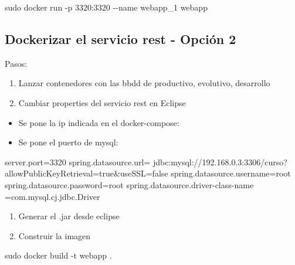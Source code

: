 \documentclass[
]{article}
\newenvironment{Shaded}{\begin{snugshade}}{\end{snugshade}}
\newcommand{\AttributeTok}[1]{\textcolor[rgb]{0.49,0.56,0.16}{#1}}
\newcommand{\FunctionTok}[1]{\textcolor[rgb]{0.02,0.16,0.49}{#1}}
\newcommand{\NormalTok}[1]{#1}
\providecommand{\tightlist}{%
  \setlength{\itemsep}{0pt}\setlength{\parskip}{0pt}}
\let\oldtexttt\texttt
\renewcommand{\texttt}[1]{
    \tcbox{\oldtexttt{#1}} 
}
\begin{document}
\begin{Shaded}
\begin{Highlighting}[]
\FunctionTok{sudo}\NormalTok{ docker run }\AttributeTok{{-}p}\NormalTok{ 3320:3320 }\AttributeTok{{-}{-}name}\NormalTok{ webapp\_1 webapp}
\end{Highlighting}
\end{Shaded}

\hypertarget{dockerizar-el-servicio-rest---opciuxf3n-2}{%
\subsection{Dockerizar el servicio rest - Opción
2}\label{dockerizar-el-servicio-rest---opciuxf3n-2}}

Pasos:

\begin{enumerate}
\def\labelenumi{\arabic{enumi}.}
\tightlist
\item
  Lanzar contenedores con las bbdd de productivo, evolutivo, desarrollo
\item
  Cambiar properties del servicio rest en Eclipse
\end{enumerate}

\begin{itemize}
\tightlist
\item
  Se pone la ip indicada en el docker-compose: \texttt{192.168.0.3}
\item
  Se pone el puerto de mysql: \texttt{3306}
\end{itemize}

\begin{Shaded}
\begin{Highlighting}[]
\NormalTok{server.port=3320}
\NormalTok{spring.datasource.url= jdbc:mysql://192.168.0.3:3306/curso?allowPublicKeyRetrieval=true\&useSSL=false}
\NormalTok{spring.datasource.username=root}
\NormalTok{spring.datasource.password=root}
\NormalTok{spring.datasource.driver{-}class{-}name =com.mysql.cj.jdbc.Driver}
\end{Highlighting}
\end{Shaded}

\begin{enumerate}
\def\labelenumi{\arabic{enumi}.}
\setcounter{enumi}{2}
\tightlist
\item
  Generar el .jar desde eclipse
\item
  Construir la imagen
\end{enumerate}

\begin{Shaded}
\begin{Highlighting}[]
\FunctionTok{sudo}\NormalTok{ docker build }\AttributeTok{{-}t}\NormalTok{ webapp .}
\end{Highlighting}
\end{Shaded}
\end{document}
